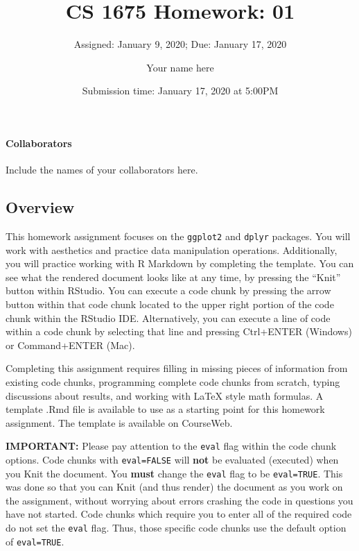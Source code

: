 \documentclass[]{article}
\title{CS 1675 Homework: 01}
\subtitle{Assigned: January 9, 2020; Due: January 17, 2020}
\author{Your name here}
\date{Submission time: January 17, 2020 at 5:00PM}
\let\oldparagraph\paragraph
\renewcommand{\paragraph}[1]{\oldparagraph{#1}\mbox{}}
\begin{document}
\maketitle

\hypertarget{collaborators}{%
\paragraph{Collaborators}\label{collaborators}}

Include the names of your collaborators here.

\hypertarget{overview}{%
\subsection{Overview}\label{overview}}

This homework assignment focuses on the \texttt{ggplot2} and
\texttt{dplyr} packages. You will work with aesthetics and practice data
manipulation operations. Additionally, you will practice working with R
Markdown by completing the template. You can see what the rendered
document looks like at any time, by pressing the ``Knit'' button within
RStudio. You can execute a code chunk by pressing the arrow button
within that code chunk located to the upper right portion of the code
chunk within the RStudio IDE. Alternatively, you can execute a line of
code within a code chunk by selecting that line and pressing Ctrl+ENTER
(Windows) or Command+ENTER (Mac).

Completing this assignment requires filling in missing pieces of
information from existing code chunks, programming complete code chunks
from scratch, typing discussions about results, and working with LaTeX
style math formulas. A template .Rmd file is available to use as a
starting point for this homework assignment. The template is available
on CourseWeb.

\textbf{IMPORTANT:} Please pay attention to the \texttt{eval} flag
within the code chunk options. Code chunks with \texttt{eval=FALSE} will
\textbf{not} be evaluated (executed) when you Knit the document. You
\textbf{must} change the \texttt{eval} flag to be \texttt{eval=TRUE}.
This was done so that you can Knit (and thus render) the document as you
work on the assignment, without worrying about errors crashing the code
in questions you have not started. Code chunks which require you to
enter all of the required code do not set the \texttt{eval} flag. Thus,
those specific code chunks use the default option of \texttt{eval=TRUE}.
\end{document}
